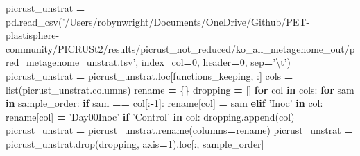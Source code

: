 \documentclass[
]{article}
\newenvironment{Shaded}{\begin{snugshade}}{\end{snugshade}}
\newcommand{\BuiltInTok}[1]{#1}
\newcommand{\CharTok}[1]{\textcolor[rgb]{0.31,0.60,0.02}{#1}}
\newcommand{\ControlFlowTok}[1]{\textcolor[rgb]{0.13,0.29,0.53}{\textbf{#1}}}
\newcommand{\DecValTok}[1]{\textcolor[rgb]{0.00,0.00,0.81}{#1}}
\newcommand{\KeywordTok}[1]{\textcolor[rgb]{0.13,0.29,0.53}{\textbf{#1}}}
\newcommand{\NormalTok}[1]{#1}
\newcommand{\OperatorTok}[1]{\textcolor[rgb]{0.81,0.36,0.00}{\textbf{#1}}}
\newcommand{\StringTok}[1]{\textcolor[rgb]{0.31,0.60,0.02}{#1}}
\begin{document}
\begin{Shaded}
\begin{Highlighting}[]
\NormalTok{picrust_unstrat }\OperatorTok{=}\NormalTok{ pd.read_csv(}\StringTok{'/Users/robynwright/Documents/OneDrive/Github/PET-plastisphere-community/PICRUSt2/results/picrust_not_reduced/ko_all_metagenome_out/pred_metagenome_unstrat.tsv'}\NormalTok{, index_col}\OperatorTok{=}\DecValTok{0}\NormalTok{, header}\OperatorTok{=}\DecValTok{0}\NormalTok{, sep}\OperatorTok{=}\StringTok{'}\CharTok{\textbackslash{}t}\StringTok{'}\NormalTok{)}
\NormalTok{picrust_unstrat }\OperatorTok{=}\NormalTok{ picrust_unstrat.loc[functions_keeping, :]}
\NormalTok{cols }\OperatorTok{=} \BuiltInTok{list}\NormalTok{(picrust_unstrat.columns)}
\NormalTok{rename }\OperatorTok{=}\NormalTok{ \{\}}
\NormalTok{dropping }\OperatorTok{=}\NormalTok{ []}
\ControlFlowTok{for}\NormalTok{ col }\KeywordTok{in}\NormalTok{ cols:}
  \ControlFlowTok{for}\NormalTok{ sam }\KeywordTok{in}\NormalTok{ sample_order:}
    \ControlFlowTok{if}\NormalTok{ sam }\OperatorTok{==}\NormalTok{ col[:}\OperatorTok{-}\DecValTok{1}\NormalTok{]:}
\NormalTok{      rename[col] }\OperatorTok{=}\NormalTok{ sam}
    \ControlFlowTok{elif} \StringTok{'Inoc'} \KeywordTok{in}\NormalTok{ col:}
\NormalTok{      rename[col] }\OperatorTok{=} \StringTok{'Day00Inoc'}
  \ControlFlowTok{if} \StringTok{'Control'} \KeywordTok{in}\NormalTok{ col:}
\NormalTok{    dropping.append(col)}
\NormalTok{picrust_unstrat }\OperatorTok{=}\NormalTok{ picrust_unstrat.rename(columns}\OperatorTok{=}\NormalTok{rename)}
\NormalTok{picrust_unstrat }\OperatorTok{=}\NormalTok{ picrust_unstrat.drop(dropping, axis}\OperatorTok{=}\DecValTok{1}\NormalTok{).loc[:, sample_order]}
\end{Highlighting}
\end{Shaded}
\end{document}

